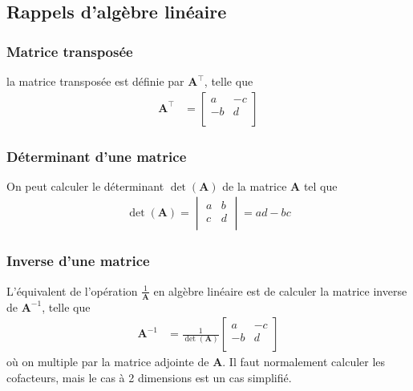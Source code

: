 \documentclass[10pt, french]{article}
\begin{document}
\begin{multicols*}{3}
\subsection*{Rappels d'algèbre linéaire}
\subsubsection*{Matrice transposée} la matrice transposée est définie par $\bm{A}^\top$, telle que
\begin{align*}
\bm{A}^{\top} & = 
\begin{bmatrix}
a	& -c \\
-b	& d \\
\end{bmatrix}
\end{align*}

\subsubsection*{Déterminant d'une matrice} On peut calculer le déterminant $\det(\bm{A})$ de la matrice $\bm{A}$ tel que
\begin{align*}
\det(\bm{A})	  = 
\begin{vmatrix}
a	& b \\
c	& d \\
\end{vmatrix}
= ad - bc
\end{align*}

\subsubsection*{Inverse d'une matrice} L'équivalent de l'opération $\frac{1}{\bm{A}}$ en algèbre linéaire est de calculer la matrice inverse de $\bm{A}^{-1}$, telle que
\begin{align*}
\bm{A}^{-1}	& = \frac{1}{\det(\bm{A})}
\begin{bmatrix}
a	& -c \\
-b	& d \\
\end{bmatrix}
\end{align*}
où on multiple par la matrice adjointe de $\bm{A}$. Il faut normalement calculer les cofacteurs, mais le cas à 2 dimensions est un cas simplifié.



\end{multicols*}


\end{document}
